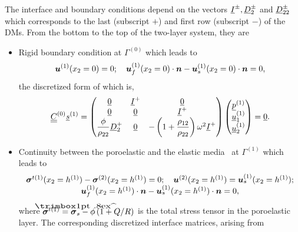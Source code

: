 The interface and boundary conditions depend on the vectors $\underline{I}^\pm, \underline{D}_{2}^\pm$ and $\underline{D}_{22}^\pm$ which corresponds to the last (subscript $+$) and first row (subscript $-$) of the DMs. From the bottom to the top of the two-layer system, they are
        \begin{itemize}
        \item Rigid boundary condition at $\Gamma^{(0)}$ which leads to
        \begin{equation}
            \boldsymbol u^{(1)}(x_2=0) = 0; \quad 
            \boldsymbol u_f^{(1)}(x_2=0) \cdot \boldsymbol n - \boldsymbol u_s^{(1)}(x_2=0) \cdot \boldsymbol n = 0,
            \label{eq1}
    \end{equation}
the discretized form of which is,
    \begin{equation} \underline{\underline{C}}^{(0)} \underline{s}^{(1)} = 
        \begin{pmatrix}
            \underline{0} & \underline{I}^+ & \underline{0} \\
            \underline{0} & \underline{0} & \underline{I}^+ \\
           \displaystyle \frac{\phi}{ \rho_{22} } \underline{D}_{2}^+ & \underline{0} & - \left( 1 +\displaystyle\frac{ \rho_{12}} { \rho_{22}} \right) \omega^2\underline{I}^+
        \end{pmatrix} \begin{pmatrix}
            \underline{p}^{(1)} \\ \underline{u}^{(1)}_{1} \\ \underline{u}^{(1)}_{2}
        \end{pmatrix} = \underline{0}.
        \label{eq:rigid_poro_cont_matrix}
    \end{equation}
    \item Continuity between the poroelastic and the elastic media~\cite{debergue1999} at $\Gamma^{(1)}$ which leads to
    \begin{equation}
    \begin{array}{c}
          \boldsymbol \sigma^{t(1)}(x_2=h^{(1)})-\boldsymbol \sigma^{(2)}(x_2=h^{(1)})=0; \quad 
        \boldsymbol u^{(2)}(x_2=h^{(1)}) = \boldsymbol u_s^{(1)}(x_2=h^{(1)}); \\
        \boldsymbol u_f^{(1)}(x_2=h^{(1)}) \cdot \boldsymbol n - \boldsymbol u_s^{(1)}(x_2=h^{(1)}) \cdot \boldsymbol n = 0,
        \end{array}
    \end{equation}
   where $\mbf \sigma^{t(1)} = \hat{\mbf \sigma_s} - \phi \left( 1 + Q/R\right)$ is the total stress tensor in the poroelastic layer. The corresponding discretized interface matrices, arising from 

\end{itemize}
